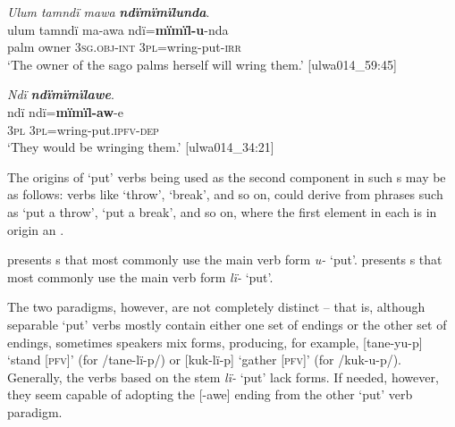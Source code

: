 \ea%
    \label{ex:phrase:86}
          \textit{Ulum tamndï mawa} \textbf{\textit{ndïmïmïlunda}}.\\
\gll ulum  tamndï  ma-awa    ndï=\textbf{mïmïl-u}{}-nda\\
    palm  owner  3\textsc{sg.obj-int}  \textsc{3pl=}wring-put-\textsc{irr}\\
\glt `The owner of the sago palms herself will wring them.’ [ulwa014\_59:45]
\z

\ea%
    \label{ex:phrase:87}
          \textit{Ndï} \textbf{\textit{ndïmïmïlawe}}.\\
\gll ndï  ndï=\textbf{mïmïl-aw}{}-e\\
    3\textsc{pl}  \textsc{3pl=}wring-put.\textsc{ipfv-dep}\\
\glt `They would be wringing them.’ [ulwa014\_34:21]
\z

  The  origins of ‘put’ verbs being used as the second component in such s may be as follows: verbs like ‘throw’, ‘break’, and so on, could derive from phrases such as ‘put a throw’, ‘put a break’, and so on, where the first element in each  is in origin an .

 presents s that most commonly use the main verb form \textit{u-} ‘put’.  presents s that most commonly use the main verb form \textit{lï-} ‘put’.

The two paradigms, however, are not completely distinct -- that is, although separable ‘put’ verbs mostly contain either one set of endings or the other set of endings, sometimes speakers mix forms, producing, for example, [tane-yu-p] ‘stand [\textsc{pfv]}’ (for /tane-lï-p/) or [kuk-lï-p] ‘gather [\textsc{pfv}]’ (for /kuk-u-p/). Generally, the verbs based on the stem \textit{lï-} ‘put’ lack  forms. If needed, however, they seem capable of adopting the [-awe] ending from the other ‘put’ verb paradigm.

